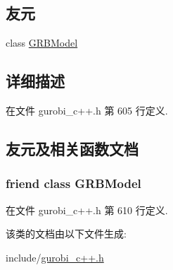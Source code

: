 \subsection*{友元}
\begin{DoxyCompactItemize}
\item 
class \hyperlink{classGRBExpr_a43690ac42cca6dade14d7fde97306d59}{G\+R\+B\+Model}
\end{DoxyCompactItemize}


\subsection{详细描述}


在文件 gurobi\+\_\+c++.\+h 第 605 行定义.



\subsection{友元及相关函数文档}
\subsubsection[{\texorpdfstring{G\+R\+B\+Model}{GRBModel}}]{\setlength{\rightskip}{0pt plus 5cm}friend class {\bf G\+R\+B\+Model}\hspace{0.3cm}{\ttfamily [friend]}}\hypertarget{classGRBExpr_a43690ac42cca6dade14d7fde97306d59}{}\label{classGRBExpr_a43690ac42cca6dade14d7fde97306d59}


在文件 gurobi\+\_\+c++.\+h 第 610 行定义.



该类的文档由以下文件生成\+:\begin{DoxyCompactItemize}
\item 
include/\hyperlink{gurobi__c_09_09_8h}{gurobi\+\_\+c++.\+h}\end{DoxyCompactItemize}
